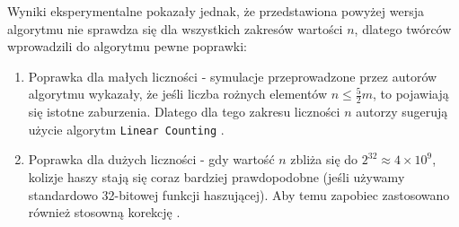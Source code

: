 Wyniki eksperymentalne pokazały jednak, że przedstawiona powyżej wersja algorytmu nie sprawdza się dla wszystkich zakresów wartości $n$, dlatego twórców wprowadzili do algorytmu pewne poprawki:
\begin{enumerate}
    \item Poprawka dla małych liczności - symulacje przeprowadzone przez autorów algorytmu wykazały, że jeśli liczba rożnych elementów $n \le \frac{5}{2}m$, 
    to pojawiają się istotne zaburzenia. Dlatego dla tego zakresu liczności $n$ autorzy sugerują użycie  algorytm \texttt{Linear Counting} .
    
    \item Poprawka dla dużych liczności - gdy wartość $n$ zbliża się do $2^{32} \approx 4 \times 10^9$, kolizje haszy stają się coraz bardziej prawdopodobne (jeśli używamy standardowo 32-bitowej funkcji haszującej). Aby temu zapobiec zastosowano również stosowną korekcję .
\end{enumerate}



